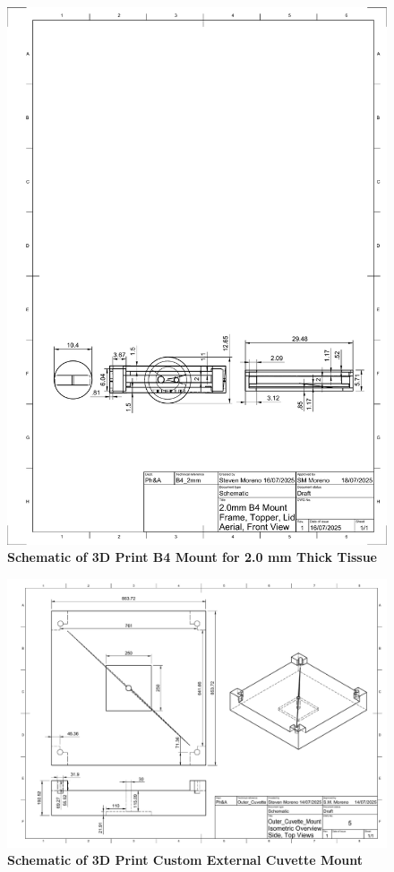     \begin{figure}[H]
        \centering
        \includegraphics[width=1\linewidth]{Figures/2.0mm B5x2 Drawing v1.pdf}
        \caption{\textbf{Schematic of 3D Print B4 Mount for 2.0 mm Thick Tissue}}
        \label{fig:enter-label}
    \end{figure}
    
    \begin{figure}[H]
        \centering
        \includegraphics[width=1\linewidth]{Figures/Outer_Cuvette_Mount Drawing v1.pdf}
        \caption{\textbf{Schematic of 3D Print Custom External Cuvette Mount}}
        \label{fig:enter-label}
    \end{figure}
    
